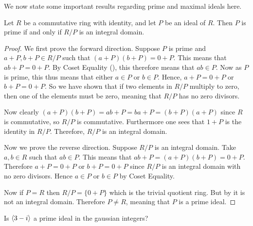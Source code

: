 We now state some important results regarding prime and maximal ideals here.
\begin{theorem}\label{thrm-prime-ideal-iff-quotient-ring-is-integral-domain}
    Let $R$ be a commutative ring with identity, and let $P$ be an ideal of $R$. Then $P$ is prime if and only if $R/P$ is an integral domain.
\end{theorem}
\begin{proof}
    We first prove the forward direction. Suppose $P$ is prime and $a+P, b+P \in R/P$ such that $(a+P)(b+P) = 0+P$. This means that $ab + P = 0 + P$. By Coset Equality (), this therefore means that $ab \in P$. Now as $P$ is prime, this thus means that either $a \in P$ or $b \in P$. Hence, $a + P = 0 + P$ or $b + P = 0 + P$. So we have shown that if two elements in $R/P$ multiply to zero, then one of the elements must be zero, meaning that $R/P$ has no zero divisors.
    
    Now clearly $(a+P)(b+P) = ab + P = ba + P = (b+P)(a+P)$ since $R$ is commutative, so $R/P$ is commutative. Furthermore one sees that $1 + P$ is the identity in $R/P$. Therefore, $R/P$ is an integral domain.

    Now we prove the reverse direction. Suppose $R/P$ is an integral domain. Take $a,b \in R$ such that $ab \in P$. This means that $ab + P = (a+P)(b+P) = 0 + P$. Therefore $a+P = 0 + P$ or $b + P = 0 + P$ since $R/P$ is an integral domain with no zero divisors. Hence $a \in P$ or $b \in P$ by Coset Equality.
    
    Now if $P = R$ then $R/P = \{0 + P\}$ which is the trivial quotient ring. But by  it is not an integral domain. Therefore $P \neq R$, meaning that $P$ is a prime ideal.
\end{proof}
\begin{exercise}
    Is $\left\langle3 - i\right\rangle$ a prime ideal in the gaussian integers?
\end{exercise}


